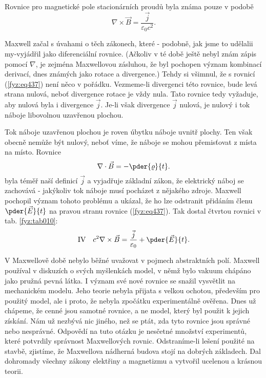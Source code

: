   Rovnice pro magnetické pole stacionárních proudů byla známa pouze v podobě
  \begin{equation}\label{fyz:eq437}
    \nabla\times\vec{B} = \dfrac{\vec{j}}{\varepsilon_0c^2}.
  \end{equation}
  
  Maxwell začal s úvahami o těch zákonech, které - podobně, jak jsme to udělalii my-vyjádřil jako 
  diferenciální rovnice. (Ačkoliv v té době ještě nebyl znám zápis pomocí \(\nabla\), je zejména 
  Maxwellovou zásluhou, že byl pochopen význam kombinací derivací, dnes známých jako rotace a 
  divergence.) Tehdy si všimnul, že s rovnicí (\ref{fyz:eq437}) není něco v pořádku. Vezmeme-li 
  divergenci této rovnice, bude levá strana nulová, neboť divergence rotace je vždy nula. Tato 
  rovnice tedy vyžaduje, aby nulová byla i divergence \(\vec{j}\). Je-li však divergence 
  \(\vec{j}\) nulová, je nulový i tok náboje libovolnou uzavřenou plochou. 
  
  Tok náboje uzavřenou plochou je roven úbytku náboje uvnitř plochy. Ten však obecně nemůže být 
  nulový, neboť víme, že náboje se mohou přemisťovat z místa na místo. Rovnice
  \begin{equation}\label{fyz:eq438}
    \nabla\cdot\vec{B} = -\pder{\varrho}{t}.
  \end{equation}
  byla téměř naší definicí \(\vec{j}\) a vyjadřuje základní zákon, že elektrický náboj se zachovává 
  - jakýkoliv tok náboje musí pocházet z nějakého zdroje. Maxwell pochopil význam tohoto problému a 
  ukázal, že ho lze odstranit přidáním členu \(\pder{\vec{E}}{t}\) na pravou stranu rovnice 
  (\ref{fyz:eq437}). Tak dostal čtvrtou rovnici v tab. \ref{fyz:tab010}:
  \begin{equation}\label{fyz:eq439}
    \text{IV}\quad c^2\nabla\times\vec{B} = \frac{\vec{j}}{\varepsilon_0} + \pder{\vec{E}}{t}.
  \end{equation}
  
  V Maxwellově době nebylo běžné uvažovat v pojmech abstraktních polí. Maxwell používal v diskuzích 
  o svých myšlenkách model, v němž bylo vakuum chápáno jako pružná pevná látka. I význam své nové 
  rovnice se snažil vysvětlit na mechanickém modelu. Jeho teorie nebyla přijata s velkou ochotou, 
  především pro použitý model, ale i proto, že nebyla zpočátku experimentálně ověřena. Dnes už 
  chápeme, že cenné jsou samotné rovnice, a ne model, který byl použit k jejich získání. Nám už 
  nezbývá nic jiného, než se ptát, zda tyto rovnice jsou správné nebo nesprávné. Odpovědí na tuto 
  otázku je nesčetné množství experimentů, které potvrdily správnost Maxwellových rovnic. 
  Odstraníme-li lešení použité na stavbě, zjistíme, že Maxwellova nádherná budova stojí na dobrých 
  základech. Dal dohromady všechny zákony elektřiny a magnetizmu a vytvořil ucelenou a krásnou 
  teorii.
  
